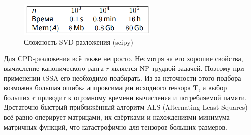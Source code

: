 			 	\begin{figure}[h]
			 		\centering
			 		\caption{Сложность SVD-разложения (scipy)}\label{tab:svd_time}
			 		\includegraphics[width=0.6\textwidth, keepaspectratio]{../figs/svd_time.png}
			 	\end{figure}
			 	
			 	Для CPD-разложения всё также непросто. Несмотря на его хорошие свойства, вычисление канонического ранга $ r $ является NP-трудной задачей. Поэтому при  применении tSSA его необходимо подбирать. Из-за неточности этого подбора возможна большая ошибка аппроксимации исходного тензора $ \mathbf{T} $, а выбор больших $ r $ приводит к огромному времени вычисления и потребляемой памяти. Достаточно быстрый приближённый алгоритм ALS (Alternating Least Squares) всё равно оперирует матрицами, их свёртками и нахождениями минимума матричных функций, что катастрофично для тензоров больших размеров.
			 
